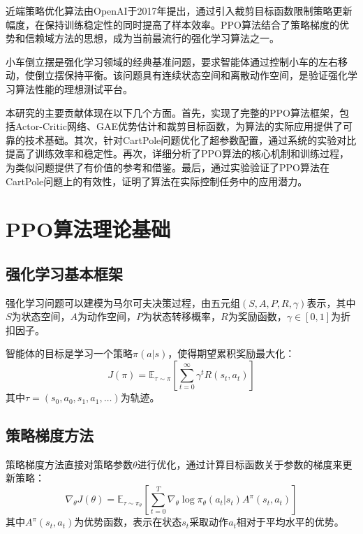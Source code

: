 \documentclass[12pt,a4paper]{article}
\begin{document}
近端策略优化算法由OpenAI于2017年提出，通过引入裁剪目标函数限制策略更新幅度，在保持训练稳定性的同时提高了样本效率。PPO算法结合了策略梯度的优势和信赖域方法的思想，成为当前最流行的强化学习算法之一。

小车倒立摆是强化学习领域的经典基准问题，要求智能体通过控制小车的左右移动，使倒立摆保持平衡。该问题具有连续状态空间和离散动作空间，是验证强化学习算法性能的理想测试平台。

本研究的主要贡献体现在以下几个方面。首先，实现了完整的PPO算法框架，包括Actor-Critic网络、GAE优势估计和裁剪目标函数，为算法的实际应用提供了可靠的技术基础。其次，针对CartPole问题优化了超参数配置，通过系统的实验对比提高了训练效率和稳定性。再次，详细分析了PPO算法的核心机制和训练过程，为类似问题提供了有价值的参考和借鉴。最后，通过实验验证了PPO算法在CartPole问题上的有效性，证明了算法在实际控制任务中的应用潜力。

\section{PPO算法理论基础}

\subsection{强化学习基本框架}

强化学习问题可以建模为马尔可夫决策过程，由五元组$(S, A, P, R, \gamma)$表示，其中$S$为状态空间，$A$为动作空间，$P$为状态转移概率，$R$为奖励函数，$\gamma \in [0, 1]$为折扣因子。

智能体的目标是学习一个策略$\pi(a|s)$，使得期望累积奖励最大化：
\begin{equation}
    J(\pi) = \mathbb{E}_{\tau \sim \pi} \left[ \sum_{t=0}^{\infty} \gamma^t R(s_t, a_t) \right]
\end{equation}
其中$\tau = (s_0, a_0, s_1, a_1, \ldots)$为轨迹。

\subsection{策略梯度方法}

策略梯度方法直接对策略参数$\theta$进行优化，通过计算目标函数关于参数的梯度来更新策略：
\begin{equation}
    \nabla_\theta J(\theta) = \mathbb{E}_{\tau \sim \pi_\theta} \left[ \sum_{t=0}^{T} \nabla_\theta \log \pi_\theta(a_t|s_t) A^{\pi}(s_t, a_t) \right]
\end{equation}
其中$A^{\pi}(s_t, a_t)$为优势函数，表示在状态$s_t$采取动作$a_t$相对于平均水平的优势。
\end{document}
